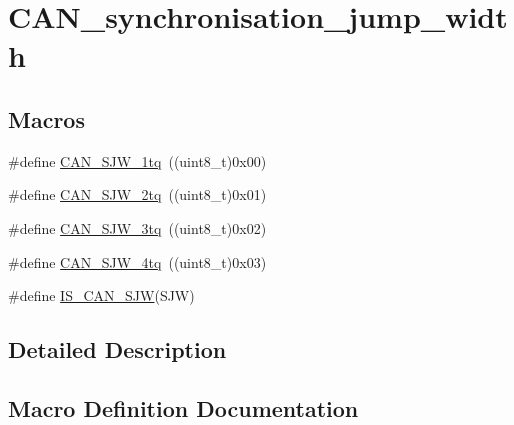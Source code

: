 \hypertarget{group___c_a_n__synchronisation__jump__width}{}\section{C\+A\+N\+\_\+synchronisation\+\_\+jump\+\_\+width}
\label{group___c_a_n__synchronisation__jump__width}
\subsection*{Macros}
\begin{DoxyCompactItemize}
\item 
\#define \mbox{\hyperlink{group___c_a_n__synchronisation__jump__width_ga4e03d22ae683b63cb4df238449ec967c}{C\+A\+N\+\_\+\+S\+J\+W\+\_\+1tq}}~((uint8\+\_\+t)0x00)
\item 
\#define \mbox{\hyperlink{group___c_a_n__synchronisation__jump__width_gad39e7656c555cc00bc4d7c1bff39916f}{C\+A\+N\+\_\+\+S\+J\+W\+\_\+2tq}}~((uint8\+\_\+t)0x01)
\item 
\#define \mbox{\hyperlink{group___c_a_n__synchronisation__jump__width_gab4de740e2184aac71c2c8cba22a8ecd2}{C\+A\+N\+\_\+\+S\+J\+W\+\_\+3tq}}~((uint8\+\_\+t)0x02)
\item 
\#define \mbox{\hyperlink{group___c_a_n__synchronisation__jump__width_ga7f26a36d478c7ba1a1441b369d62f693}{C\+A\+N\+\_\+\+S\+J\+W\+\_\+4tq}}~((uint8\+\_\+t)0x03)
\item 
\#define \mbox{\hyperlink{group___c_a_n__synchronisation__jump__width_ga4e4f344712d3bcac1975318d4ab9a383}{I\+S\+\_\+\+C\+A\+N\+\_\+\+S\+JW}}(S\+JW)
\end{DoxyCompactItemize}


\subsection{Detailed Description}


\subsection{Macro Definition Documentation}
\mbox{\label{group___c_a_n__synchronisation__jump__width_ga4e03d22ae683b63cb4df238449ec967c}} 
